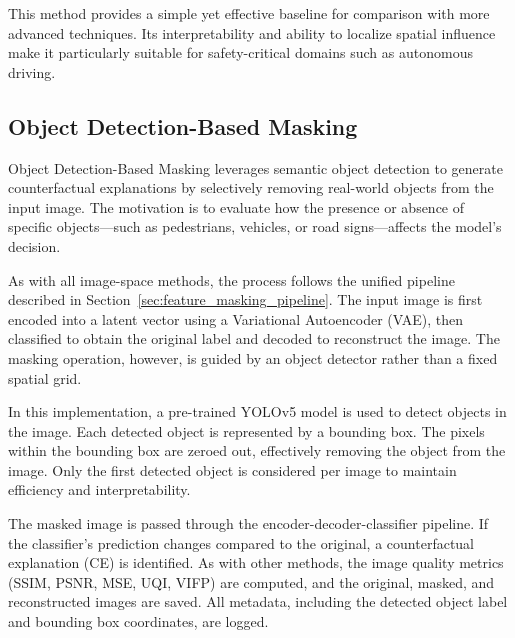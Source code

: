 \vspace{1em}

This method provides a simple yet effective baseline for comparison with more advanced techniques. Its interpretability and ability to localize spatial influence make it particularly suitable for safety-critical domains such as autonomous driving.



\subsection{Object Detection-Based Masking} \label{sec:object_detection_masking}

Object Detection-Based Masking leverages semantic object detection to generate counterfactual explanations by selectively removing real-world objects from the input image. The motivation is to evaluate how the presence or absence of specific objects—such as pedestrians, vehicles, or road signs—affects the model’s decision.

As with all image-space methods, the process follows the unified pipeline described in Section~\ref{sec:feature_masking_pipeline}. The input image is first encoded into a latent vector using a Variational Autoencoder (VAE), then classified to obtain the original label and decoded to reconstruct the image. The masking operation, however, is guided by an object detector rather than a fixed spatial grid.

In this implementation, a pre-trained YOLOv5 model is used to detect objects in the image. Each detected object is represented by a bounding box. The pixels within the bounding box are zeroed out, effectively removing the object from the image. Only the first detected object is considered per image to maintain efficiency and interpretability.

The masked image is passed through the encoder-decoder-classifier pipeline. If the classifier’s prediction changes compared to the original, a counterfactual explanation (CE) is identified. As with other methods, the image quality metrics (SSIM, PSNR, MSE, UQI, VIFP) are computed, and the original, masked, and reconstructed images are saved. All metadata, including the detected object label and bounding box coordinates, are logged.

